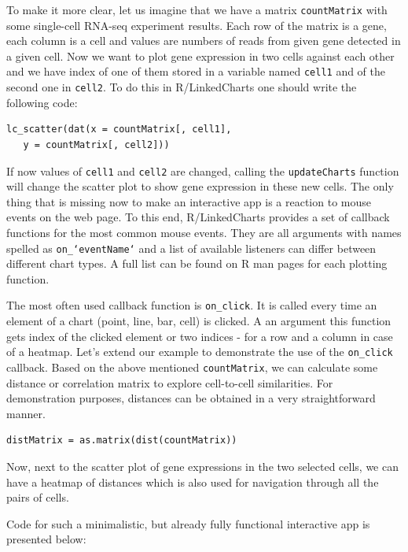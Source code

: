 \documentclass[twocolumn,10pt]{article}
\begin{document}
To make it more clear, let us imagine that we have a matrix \texttt{countMatrix} with some single-cell RNA-seq experiment results. Each row of the matrix is a gene, each column is a cell and values are numbers of reads from given gene detected in a given cell. Now we want to plot gene expression in two cells against each other and we have index of one of them stored in a variable named \texttt{cell1} and of the second one in \texttt{cell2}. To do this in R/LinkedCharts one should write the following code:

\begin{verbatim}
lc_scatter(dat(x = countMatrix[, cell1], 
   y = countMatrix[, cell2]))
\end{verbatim}

If now values of \texttt{cell1} and \texttt{cell2} are changed, calling the \texttt{updateCharts} function will change the scatter plot to show gene expression in these new cells. The only thing that is missing now to make an interactive app is a reaction to mouse events on the web page. To this end, R/LinkedCharts provides a set of callback functions for the most common mouse events. They are all arguments with names spelled as \texttt{on_`eventName`} and a list of available listeners can differ between different chart types. A full list can be found on R man pages for each plotting function.

The most often used callback function is \texttt{on_click}. It is called every time an element of a chart (point, line, bar, cell) is clicked. A an argument this function gets index of the clicked element or two indices - for a row and a column in case of a heatmap. Let's extend our example to demonstrate the use of the \texttt{on_click} callback. Based on the above mentioned \texttt{countMatrix}, we can calculate some distance or correlation matrix to explore cell-to-cell similarities. For demonstration purposes, distances can be obtained in a very straightforward manner.

\begin{verbatim}
distMatrix = as.matrix(dist(countMatrix))
\end{verbatim}

Now, next to the scatter plot of gene expressions in the two selected cells, we can have a heatmap of distances which is also used for navigation through all the pairs of cells. 

Code for such a minimalistic, but already fully functional interactive app is presented below:
\end{document}
